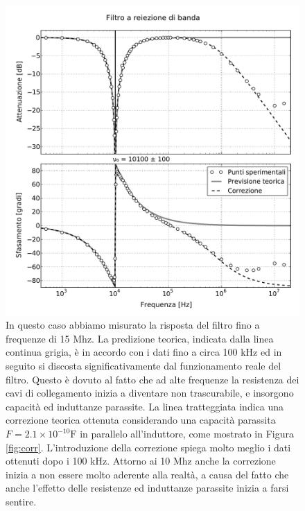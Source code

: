 \begin{figure}
  \includegraphics[scale=0.55]{notch.pdf}
  \caption{In questo caso abbiamo
    misurato la risposta del filtro fino a frequenze di 15 Mhz. La predizione teorica, indicata dalla linea
    continua grigia, è in accordo con i dati fino a circa 100 kHz ed in seguito si discosta significativamente
    dal funzionamento reale del filtro. Questo è dovuto al fatto che ad alte frequenze la resistenza dei cavi
    di collegamento inizia a diventare non trascurabile, e insorgono capacità ed induttanze parassite. La linea
    tratteggiata indica una correzione teorica ottenuta considerando una capacità parassita
    $F = 2.1 \times 10^{-10} \si{\farad}$ in parallelo all'induttore, come mostrato in Figura \ref{fig:corr}.
    L'introduzione della correzione spiega molto meglio i dati ottenuti dopo i 100 kHz. Attorno ai 10 Mhz anche la
    correzione inizia a non essere molto aderente alla realtà, a causa del fatto che anche l'effetto delle resistenze
    ed induttanze parassite inizia a farsi sentire.}
  \label{fig:g_notch}
\end{figure}
